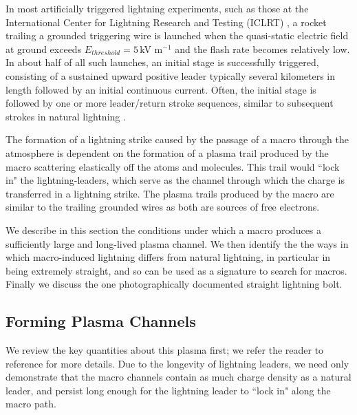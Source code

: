 \documentclass[%
 reprint,
 amsmath,amssymb,
 aps,
]{revtex4-2}
\begin{document}
    In most artificially triggered lightning experiments, such as those at the International Center for Lightning Research and Testing (ICLRT) \citep{Hill2012, Hill2013}, a rocket trailing a grounded triggering wire is launched when the quasi-static electric field at ground exceeds $E_{threshold} = 5\,$kV m$^{-1}$ and the flash rate becomes relatively low. In about half of all such launches, an initial stage is successfully triggered, consisting of a sustained upward positive leader typically several kilometers in length followed by an initial continuous current. Often, the initial stage is followed by one or more leader/return stroke sequences, similar to subsequent strokes in natural lightning \citep{Wang1999, rocket2012}.

    The formation of a lightning strike caused by the passage of a macro through the atmosphere is dependent on the formation of a plasma trail produced by the macro scattering elastically off the atoms and molecules. This trail would ``lock in" the lightning-leaders, which serve as the channel through which the charge is transferred in a lightning strike. The plasma trails produced by the macro are similar to the trailing grounded wires as both are sources of free electrons.

    We describe in this section the conditions under which a macro produces a sufficiently large and long-lived plasma channel. We then identify the the ways in which macro-induced lightning differs from natural lightning, in particular in being extremely straight, and so can be used as a signature to search for macros. Finally we discuss the one photographically documented straight lightning bolt.

    \subsection{Forming Plasma Channels} %
    \label{sub:macro_induced_plasma_channels}

        We review the key quantities about this plasma first; we refer the reader to reference \citep{Sidhu2018auv} for more details. Due to the longevity of lightning leaders, we need only demonstrate that the macro channels contain as much charge density as a natural leader, and persist long enough for the lightning leader to ``lock in" along the macro path.
\end{document}
